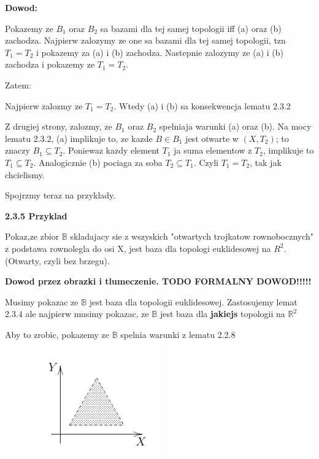 \documentclass{article}
\begin{document}
\textbf{Dowod:}

Pokazemy ze $B_{1}$ oraz $B_{2}$ sa bazami dla tej samej topologii iff (a) oraz (b) zachodza. Najpierw zalozymy ze one sa bazami dla tej samej topologii, tzn $T_{1} = T_{2}$ i pokazemy za (a) i (b) zachodza. Nastepnie zalozymy ze (a) i (b) zachodza i pokazemy ze $T_{1} = T_{2}$.

Zatem:

Najpierw zalozmy ze $T_{1} = T_{2}$. Wtedy (a) i (b) sa konsekwencja lematu 2.3.2

Z drugiej strony, zalozmy, ze $B_{1}$ oraz $B_{2}$ spelniaja warunki (a) oraz (b). Na mocy lematu 2.3.2, (a) implikuje to, ze kazde $B \in B_{1}$ jest otwarte w $(X,T_{2})$; to znaczy $B_{1} \subseteq T_{2}$. Poniewaz kazdy element $T_{1}$ ja suma elementow z $T_{2}$, implikuje to $T_{1} \subseteq T_{2}$. Analogicznie (b) pociaga za soba $T_{2} \subseteq T_{1}$. Czyli $T_{1} = T_{2}$, tak jak chcielismy.

Spojrzmy teraz na przyklady.

\textbf{2.3.5 Przyklad}

Pokaz,ze zbior $\mathbb{B}$ skladajacy sie z wszyskich "otwartych trojkatow rownobocznych" z podstawa rownolegla do osi X, jest baza dla topologi euklidesowej na $R^{2}$.(Otwarty, czyli bez brzegu).

\textbf{Dowod przez obrazki i tlumeczenie. TODO FORMALNY DOWOD!!!!!}

Musimy pokazac ze $\mathbb{B}$ jest baza dla topologii euklidesowej. Zastosujemy lemat 2.3.4 ale najpierw musimy pokazac, ze $\mathbb{B}$ jest baza dla \textbf{jakiejs} topologii na $\mathbb{R}^{2}$ 

Aby to zrobic, pokazemy ze $\mathbb{B}$ spelnia warunki z lematu 2.2.8

\begin{figure}[h]
   \centering
   \includegraphics[width=0.5\textwidth]{trojkat1.png}
\end{figure}
\end{document}
